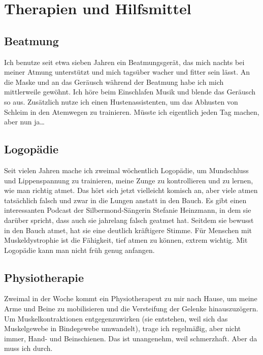 \documentclass[fontsize=14pt,a4paper,headinclude,DIV=calc,automark]{scrbook}
\begin{document}
\section{Therapien und Hilfsmittel}
\label{sec:therapien_und_hilfsmittel}

\subsection{Beatmung}

Ich benutze seit etwa sieben Jahren ein Beatmungsgerät, das mich nachts bei meiner Atmung unterstützt und mich tagsüber wacher und fitter sein lässt. An die Maske und an das Geräusch während der Beatmung habe ich mich mittlerweile gewöhnt. Ich höre beim Einschlafen Musik und blende das Geräusch so aus. Zusätzlich nutze ich einen Hustenassistenten, um das Abhusten von Schleim in den Atemwegen zu trainieren. Müsste ich eigentlich jeden Tag machen, aber nun ja…

\subsection{Logopädie}

Seit vielen Jahren mache ich zweimal wöchentlich Logopädie, um Mundschluss und Lippenspannung zu trainieren, meine Zunge zu kontrollieren und zu lernen, wie man richtig atmet. Das hört sich jetzt vielleicht komisch an, aber viele atmen tatsächlich falsch und zwar in die Lungen anstatt in den Bauch. Es gibt einen interessanten Podcast der Silbermond-Sängerin Stefanie Heinzmann, in dem sie darüber spricht, dass auch sie jahrelang falsch geatmet hat. Seitdem sie bewusst in den Bauch atmet, hat sie eine deutlich kräftigere Stimme. Für Menschen mit Muskeldystrophie ist die Fähigkeit, tief atmen zu können, extrem wichtig. Mit Logopädie kann man nicht früh genug anfangen.

\subsection{Physiotherapie}

Zweimal in der Woche kommt ein Physiotherapeut zu mir nach Hause, um meine Arme und Beine zu mobilisieren und die Versteifung der Gelenke hinauszuzögern. Um Muskelkontraktionen entgegenzuwirken (sie entstehen, weil sich das Muskelgewebe in Bindegewebe umwandelt), trage ich regelmäßig, aber nicht immer, Hand- und Beinschienen. Das ist unangenehm, weil schmerzhaft. Aber da muss ich durch.
\end{document}
